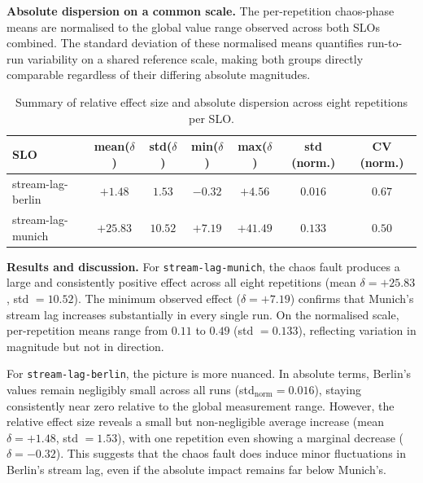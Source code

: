 \documentclass[12pt, a4paper]{article}
\begin{document}
\textbf{Absolute dispersion on a common scale.} The per-repetition chaos-phase
means are normalised to the global value range observed across both SLOs combined.
The standard deviation of these normalised means quantifies run-to-run variability
on a shared reference scale, making both groups directly comparable regardless of
their differing absolute magnitudes.

\begin{table}[h]
\centering
\caption{Summary of relative effect size and absolute dispersion across eight
         repetitions per SLO.}
\label{tab:reproducibility}
\begin{tabular}{lcccccc}
\toprule
\textbf{SLO} & \textbf{mean($\delta$)} & \textbf{std($\delta$)} &
\textbf{min($\delta$)} & \textbf{max($\delta$)} &
\textbf{std (norm.)} & \textbf{CV (norm.)} \\
\midrule
stream-lag-berlin & $+1.48$ & $1.53$ & $-0.32$ & $+4.56$ & $0.016$ & $0.67$ \\
stream-lag-munich & $+25.83$ & $10.52$ & $+7.19$ & $+41.49$ & $0.133$ & $0.50$ \\
\bottomrule
\end{tabular}
\end{table}

\textbf{Results and discussion.}
For \texttt{stream-lag-munich}, the chaos fault produces a large and consistently
positive effect across all eight repetitions (mean $\delta = +25.83$,
std $= 10.52$). The minimum observed effect ($\delta = +7.19$) confirms that
Munich's stream lag increases substantially in every single run.
On the normalised scale, per-repetition means range from $0.11$ to $0.49$
(std $= 0.133$), reflecting variation in magnitude but not in direction.

For \texttt{stream-lag-berlin}, the picture is more nuanced. In absolute terms,
Berlin's values remain negligibly small across all runs (std$_{\text{norm}} =
0.016$), staying consistently near zero relative to the global measurement range.
However, the relative effect size reveals a small but non-negligible average
increase (mean $\delta = +1.48$, std $= 1.53$), with one repetition even showing a
marginal decrease ($\delta = -0.32$). This suggests that the chaos fault does
induce minor fluctuations in Berlin's stream lag, even if the absolute impact
remains far below Munich's.
\end{document}
